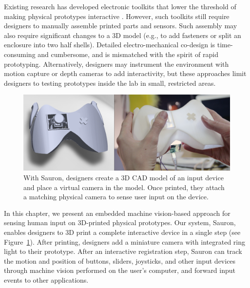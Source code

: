 Existing research has developed electronic toolkits that lower the threshold of making physical prototypes interactive \cite{arduino, greenberg-phidgets, hartmann-dtools}.
However, such toolkits still require designers to manually assemble printed parts and sensors. Such assembly may also require significant changes to a 3D model (e.g., to add fasteners or split an enclosure into two half shells). Detailed electro-mechanical co-design is time-consuming and cumbersome, and is mismatched with the spirit of rapid prototyping. Alternatively, designers may instrument the environment with motion capture \cite{akaoka-displayobjects} or depth cameras \cite{wilson-depthtouch} to add interactivity, but these approaches limit designers to testing prototypes inside the lab in small, restricted areas.

\begin{figure}
\centering
\includegraphics[width=1.0\columnwidth]{figures/sauron/fig1-gamecontroller.jpg}
\caption{With Sauron, designers create a 3D CAD model of an input device and place a virtual camera in the model. Once printed, they attach a matching physical camera to sense user input on the device.}
\label{fig:sauron-teaser}
\end{figure}

In this chapter, we present an embedded machine vision-based approach for sensing human input on 3D-printed physical prototypes. Our system, Sauron, enables designers to 3D print a complete interactive device in a single step (see Figure~\ref{fig:sauron-teaser}). After printing, designers add a miniature camera with integrated ring light to their prototype. After an interactive registration step, Sauron can track the motion and position of buttons, sliders, joysticks, and other input devices through machine vision performed on the user's computer, and forward input events to other applications.

